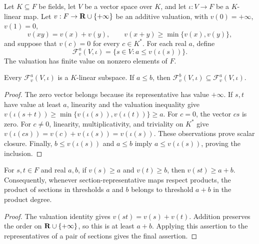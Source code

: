 \begin{definition}
\label{sc0-canonical-port:fil:valuation-filtration}
\leanok
Let \(K\subseteq F\) be fields, let \(V\) be a vector space over
\(K\), and let \(\iota:V\to F\) be a \(K\)-linear map. Let
\(v:F\to\mathbf{R}\cup\{+\infty\}\) be an additive valuation, with
\(v(0)=+\infty\), \(v(1)=0\),
\[
 v(xy)=v(x)+v(y),\qquad
 v(x+y)\geq\min\{v(x),v(y)\},
\]
and suppose that \(v(c)=0\) for every \(c\in K^*\). For each real
\(a\), define
\[
 \mathcal F^a_v(V,\iota)=\{s\in V:a\leq v(\iota(s))\}.
\]
The valuation has finite value on nonzero elements of \(F\).
\end{definition}

\begin{lemma}
\label{sc0-canonical-port:fil:valuation-subspace}
\leanok
Every \(\mathcal F^a_v(V,\iota)\) is a \(K\)-linear subspace. If
\(a\leq b\), then
\(\mathcal F^b_v(V,\iota)\subseteq\mathcal F^a_v(V,\iota)\).
\end{lemma}
\begin{proof}
The zero vector belongs because its representative has value
\(+\infty\). If \(s,t\) have value at least \(a\), linearity and the
valuation inequality give
\(v(\iota(s+t))\geq\min\{v(\iota(s)),v(\iota(t))\}\geq a\).
For \(c=0\), the vector \(cs\) is zero. For \(c\ne0\), linearity,
multiplicativity, and triviality on \(K^*\) give
\(v(\iota(cs))=v(c)+v(\iota(s))=v(\iota(s))\).
These observations prove scalar closure. Finally, \(b\leq v(\iota(s))\)
and \(a\leq b\) imply \(a\leq v(\iota(s))\), proving the inclusion.
\end{proof}

\begin{lemma}
\label{sc0-canonical-port:fil:valuation-product}
\leanok
For \(s,t\in F\) and real \(a,b\), if \(v(s)\geq a\) and
\(v(t)\geq b\), then \(v(st)\geq a+b\).
Consequently, whenever section-representative maps respect products,
the product of sections in thresholds \(a\) and \(b\) belongs to
threshold \(a+b\) in the product degree.
\end{lemma}
\begin{proof}
The valuation identity gives \(v(st)=v(s)+v(t)\). Addition preserves
the order on \(\mathbf{R}\cup\{+\infty\}\), so this is at least \(a+b\).
Applying this assertion to the representatives of a pair of sections
gives the final assertion.
\end{proof}

